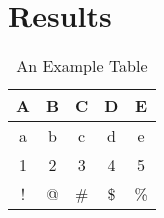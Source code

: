 \chapter{Results \label{sec:results}}
\lipsum[21-23]

\begin{table}[H]
    \centering
    \begin{tabular}{ccccc}
        \textbf{A} & \textbf{B} & \textbf{C} & \textbf{D} & \textbf{E} \\ \hline
        a          & b          & c          & d          & e          \\
        1          & 2          & 3          & 4          & 5          \\
        !          & @          & \#         & \$         & \%        
    \end{tabular}
    \caption{An Example Table}
    \label{tab:example}
\end{table}
